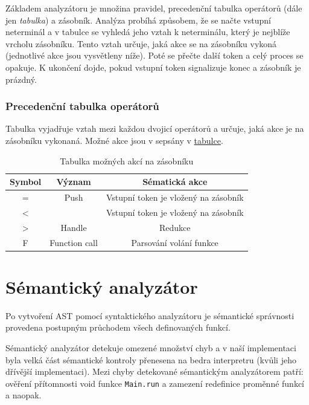 \documentclass[a4paper,11pt]{article}
\begin{document}
Základem analyzátoru je množina pravidel, precedenční tabulka operátorů (dále jen \textit{tabulka}) a zásobník.
Analýza probíhá způsobem, že se načte vstupní neterminál a v tabulce se vyhledá jeho vztah k neterminálu, který je nejblíže vrcholu zásobníku. Tento vztah určuje, jaká akce se na zásobníku vykoná (jednotlivé akce jsou vysvětleny níže). Poté se přečte další token a celý proces se opakuje. K ukončení dojde, pokud vstupní token signalizuje konec a zásobník je prázdný.

\subsubsection{Precedenční tabulka operátorů}


Tabulka vyjadřuje vztah mezi každou dvojicí operátorů a určuje, jaká akce je na zásobníku vykonaná. Možné akce jsou v sepsány v \hyperref[tab:stackRules]{tabulce}.

\begin{table}[]
\centering
\label{tab:stackRules}
\begin{tabular}{@{}ccc@{}}
\toprule
Symbol       & Význam                            & Sématická akce                         \\ \midrule
=            & Push                              & Vstupní token je vložený na zásobník  \\
\textless    &                                   & Vstupní token je vložený na zásobník \\
\textgreater & Handle                            & Redukce                                \\
F            & Function call                     & Parsování volání funkce \\ \bottomrule
\end{tabular}
\caption{Tabulka možných akcí na zásobníku}
\end{table}

\section{Sémantický analyzátor}
Po vytvoření AST pomocí syntaktického analyzátoru je sémantické správnosti provedena postupným průchodem všech definovaných funkcí.

Sémantický analyzátor detekuje omezené množství chyb a v naší implementaci byla velká část sémantické kontroly přenesena na bedra interpretru (kvůli jeho dřívější implementaci). Mezi chyby detekované sémantickým analyzátorem patří: ověření přítomnosti void funkce \texttt{Main.run} a zamezení redefinice proměnné funkcí a naopak.
\end{document}
